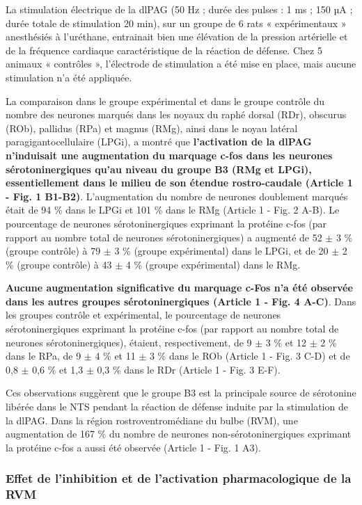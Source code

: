\documentclass[a4paper,12pt,twoside]{report}
\begin{document}
La stimulation électrique de la dlPAG (50 Hz ; durée des pulses : 1 ms ; 150 µA ; durée totale de stimulation 20 min), sur un groupe de 6 rats « expérimentaux » anesthésiés à l’uréthane, entrainait bien une élévation de la pression artérielle et de la fréquence cardiaque caractéristique de la réaction de défense. Chez 5 animaux « contrôles », l’électrode de stimulation a été mise en place, mais aucune stimulation n’a été appliquée.

La comparaison dans le groupe expérimental et dans le groupe contrôle du nombre des neurones marqués dans les noyaux du raphé dorsal (RDr), obscurus (ROb), pallidus (RPa) et magnus (RMg), ainsi dans le noyau latéral paragigantocellulaire (LPGi), a montré que \textbf{l’activation de la dlPAG n'induisait une augmentation du marquage c-fos dans les neurones sérotoninergiques qu'au niveau du groupe B3 (RMg et LPGi), essentiellement dans le milieu de son étendue rostro-caudale (Article 1 - Fig. 1 B1-B2)}. L’augmentation du nombre de neurones doublement marqués était de 94 \% dans le LPGi et 101 \% dans le RMg (Article 1 - Fig. 2 A-B). Le pourcentage de neurones sérotoninergiques exprimant la protéine c-fos (par rapport au nombre total de neurones sérotoninergiques) a augmenté de 52 $\pm$ 3 \% (groupe contrôle) à 79 $\pm$ 3 \% (groupe expérimental) dans le LPGi, et de 20 $\pm$ 2 \% (groupe contrôle) à 43 $\pm$ 4 \% (groupe expérimental) dans le RMg. 

\textbf{Aucune augmentation significative du marquage c-Fos n’a été observée dans les autres groupes sérotoninergiques (Article 1 - Fig. 4 A-C)}. Dans les groupes contrôle et expérimental, le pourcentage de neurones sérotoninergiques exprimant la protéine c-fos (par rapport au nombre total de neurones sérotoninergiques), étaient, respectivement, de 9 $\pm$ 3 \% et 12 $\pm$ 2 \% dans le RPa, de 9 $\pm$ 4 \% et 11 $\pm$ 3 \% dans le ROb (Article 1 - Fig. 3 C-D) et de 0,8 $\pm$ 0,6 \% et 1,3 $\pm$ 0,3 \% dans le RDr (Article 1 - Fig. 3 E-F).

Ces observations suggèrent que le groupe B3 est la principale source de sérotonine libérée dans le NTS pendant la réaction de défense induite par la stimulation de la dlPAG.
Dans la région rostroventromédiane du bulbe (RVM), une augmentation de 167 \% du nombre de neurones non-sérotoninergiques exprimant la protéine c-fos a aussi été observée (Article 1 - Fig. 1 A3). 

\subsubsection{Effet de l’inhibition et de l’activation pharmacologique de la RVM }
\end{document}
